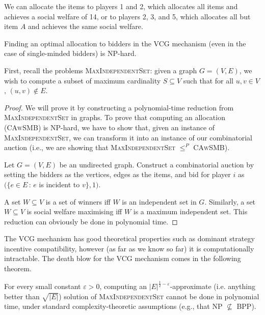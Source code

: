 				We can allocate the items to players 1 and 2, which allocates
				all items and achieves a social welfare of 14, or to players 2,
				3, and 5, which allocates all but item $A$ and achieves the
				same social welfare.

				\begin{theorem}
					Finding an optimal allocation to bidders in the VCG
					mechanism (even in the case of single-minded bidders) is
					NP-hard.
				\end{theorem}

				First, recall the problems \textsc{MaxIndependentSet}: given a
				graph $G = (V,E)$, we wish to compute a subset of maximum
				cardinality $S \subseteq V$ such that for all $u,v \in V$,
				$(u,v) \not \in E$.

				\begin{proof}
					We will prove it by constructing a polynomial-time
					reduction from \textsc{MaxIndependentSet} in graphs. To
					prove that computing an allocation (\textsc{CAwSMB}) is
					NP-hard, we have to show that, given an instance of
					\textsc{MaxIndependentSet}, we can transform it into an
					instance of our combinatorial auction (i.e., we are showing
					that \textsc{MaxIndependentSet} $\le^P$ \textsc{CAwSMB}).

					Let $G=(V,E)$ be an undirected graph. Construct a
					combinatorial auction by setting the bidders as the
					vertices, edges as the items, and bid for player $i$ as
					$(\{e \in E \, : \, e$ is incident to $v \}, 1)$.

					A set $W \subseteq V$ is a set of winners iff $W$ is an
					independent set in $G$. Similarly, a set $W \subseteq V$ is
					social welfare maximising iff $W$ is a maximum independent
					set. This reduction can obviously be done in polynomial
					time.
				\end{proof}

				The VCG mechanism has good theoretical properties such as
				dominant strategy incentive compatibility, however (as far as
				we know so far) it is computationally intractable. The death
				blow for the VCG mechanism comes in the following theorem.

				\begin{theorem}
					\label{thm:maxIndSetInapproximability}
					For every small constant $\varepsilon >0$, computing an
					$|E|^{\frac{1}{2} - \varepsilon}$-approximate (i.e.
					anything better than $\sqrt{|E|}$) solution of
					\textsc{MaxIndependentSet} cannot be done in polynomial
					time, under standard complexity-theoretic assumptions
					(e.g., that NP $\not \subseteq$ BPP).
				\end{theorem}

